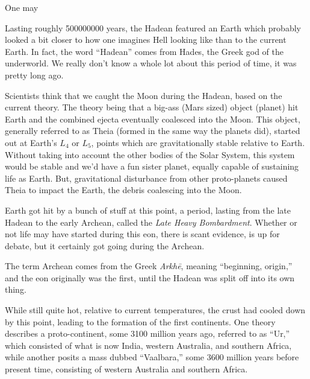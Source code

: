 \documentclass[./butidigress.tex]{subfiles}
\begin{document}
One may

Lasting roughly \num{500000000} years, the Hadean featured an Earth which probably looked a bit closer to how one imagines Hell looking like than to the current Earth.
In fact, the word \enquote{Hadean} comes from Hades, the Greek god of the underworld.
We really don't know a whole lot about this period of time, it was pretty long ago.

Scientists think that we caught the Moon during the Hadean, based on the current theory.
The theory being that a big-ass (Mars sized) object (planet) hit Earth and the combined ejecta eventually coalesced into the Moon.\autocite{wheredidthemooncomefrom}
This object, generally referred to as Theia (formed in the same way the planets did), started out at Earth's $L_{4}$ or $L_{5}$, points which are gravitationally stable relative to Earth.\autocite[3--4]{wheredidthemooncomefrom}
Without taking into account the other bodies of the Solar System, this system would be stable and we'd have a fun sister planet, equally capable of sustaining life as Earth.
But, gravitational disturbance from other proto-planets caused Theia to impact the Earth, the debris coalescing into the Moon.\autocite[44--47]{wheredidthemooncomefrom}

Earth got hit by a bunch of stuff at this point, a period, lasting from the late Hadean to the early Archean, called the \emph{Late Heavy Bombardment}.\autocite{lunarbombardment}
Whether or not life may have started during this eon, there is scant evidence, is up for debate, but it certainly got going during the Archean.

The term Archean comes from the Greek \emph{Arkh\={e}}, meaning \enquote{beginning, origin,} and the eon originally was the first, until the Hadean was split off into its own thing.

While still quite hot, relative to current temperatures, the crust had cooled down by this point, leading to the formation of the first continents.
One theory describes a proto-continent, some \num{3100} million years ago, referred to as \enquote{Ur,} which consisted of what is now India, western Australia, and southern Africa,\autocite{historyofcontinents} while another posits a mass dubbed \enquote{Vaalbara,} some \num{3600} million years before present time, consisting of western Australia and southern Africa.\autocite{sequencestratigraphy}
\end{document}
